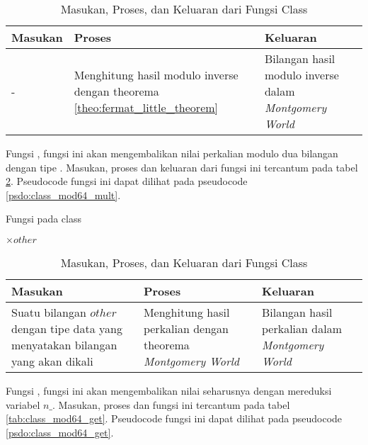 \begin{table}[]
	\Centering
	\begin{tabular}{|p{3cm}|p{3cm}|p{3cm}|}
	\hline
	Masukan                                                      & Proses                                   & Keluaran \\ \hline
	- & Menghitung hasil modulo inverse dengan theorema \ref{theo:fermat_little_theorem} & Bilangan hasil modulo inverse dalam \textit{Montgomery World} \\ \hline
	\end{tabular}
	\caption{Masukan, Proses, dan Keluaran dari Fungsi  Class }
	\label{tab:class_mod64_inverse}
\end{table}

Fungsi , fungsi ini akan mengembalikan nilai perkalian modulo dua bilangan dengan tipe . Masukan, proses dan keluaran dari fungsi ini tercantum pada tabel \ref{tab:class_mod64_mult}. Pseudocode fungsi ini dapat dilihat pada pseudocode \ref{psdo:class_mod64_mult}. 

\begin{algorithm}
	\caption{Fungsi  pada class }
	\label{psdo:class_mod64_mult}
	\begin{algorithmic}[1]
		\State \Return {} $ \times other $
	\end{algorithmic}
\end{algorithm}

\begin{table}[]
	\Centering
	\begin{tabular}{|p{3cm}|p{3cm}|p{3cm}|}
	\hline
	Masukan                                                      & Proses                                   & Keluaran \\ \hline
	Suatu bilangan $ other $ dengan tipe data \fakesc{Mod64} yang menyatakan bilangan yang akan dikali & Menghitung hasil perkalian dengan theorema \textit{Montgomery World} & Bilangan hasil perkalian dalam \textit{Montgomery World} \\ \hline
	\end{tabular}
	\caption{Masukan, Proses, dan Keluaran dari Fungsi  Class }
	\label{tab:class_mod64_mult}
\end{table}

\newpage

Fungsi , fungsi ini akan mengembalikan nilai seharusnya dengan mereduksi variabel $ n\_ $. Masukan, proses dan fungsi ini tercantum pada tabel \ref{tab:class_mod64_get}. Pseudocode fungsi ini dapat dilihat pada pseudocode \ref{psdo:class_mod64_get}.

